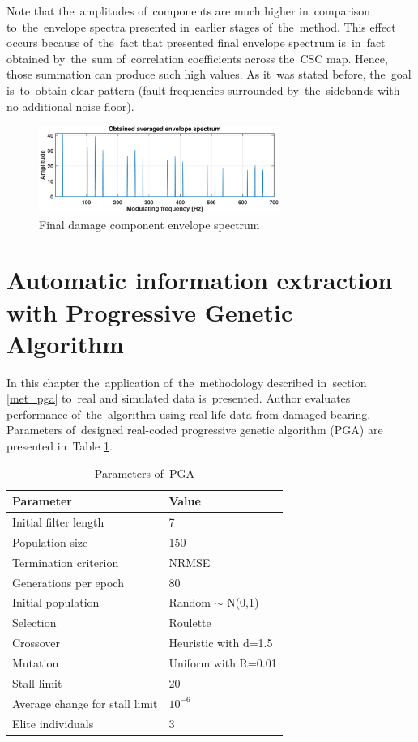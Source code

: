 Note that the~amplitudes of~components are much higher in~comparison to~the~envelope spectra presented in~earlier stages of~the~method. This effect occurs because of~the~fact that presented final envelope spectrum is~in~fact obtained by~the~sum of~correlation coefficients across the~CSC map. Hence, those summation can produce such high values. As it~was stated before, the~goal is~to~obtain clear pattern (fault frequencies surrounded by~the~sidebands with no additional noise floor).

\begin{figure}[ht!]
\centering
\includegraphics[width=0.7\textwidth]{wykresy/csc_out2}
\caption{Final damage component envelope spectrum}
\label{fig:csc_out2}
\end{figure}

\clearpage
\section{Automatic information extraction with Progressive Genetic Algorithm}\label{results_pga}

In this chapter the~application of~the~methodology described in~section \ref{met_pga} to~real and simulated data is~presented. Author evaluates performance of~the~algorithm using real-life data from damaged bearing. Parameters of~designed real-coded progressive genetic algorithm (PGA) are presented in~Table \ref{tab:tab3}.

\begin{table}[ht!]
  \centering
  \caption{Parameters of~PGA}
  \begin{tabular}{|l|l|}
  \hline
     \textbf{Parameter} & \textbf{Value} \\ \hline
     Initial filter length & 7 \\ \hline
     Population size & 150 \\ \hline
     Termination criterion & NRMSE \\ \hline
     Generations per epoch & 80 \\ \hline
     Initial population & Random $\sim$ N(0,1) \\ \hline
     Selection & Roulette \\ \hline
     Crossover & Heuristic with d=1.5 \\ \hline
     Mutation & Uniform with R=0.01 \\ \hline
     Stall limit & 20 \\ \hline
     Average change for stall limit & $10^{-6}$ \\ \hline
     Elite individuals & 3 \\
  \hline
  \end{tabular}
  \label{tab:tab3}
\end{table}

